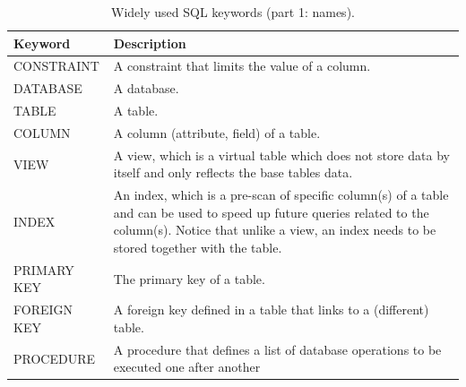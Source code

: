 \begin{table}
	\centering \caption{Widely used SQL keywords (part 1: names).}\label{ch:db:tab:sqlkeywords1}
	\begin{tabularx}{\textwidth}{lX}
		\hline
		Keyword & Description \\ \hline
		CONSTRAINT & A constraint that limits the value of a column. \\ \hdashline
		DATABASE & A database. \\ \hdashline
		TABLE & A table. \\ \hdashline
		COLUMN & A column (attribute, field) of a table. \\ \hdashline
		VIEW & A view, which is a virtual table which does not store data by itself and only reflects the base tables data. \\ \hdashline
		INDEX & An index, which is a pre-scan of specific column(s) of a table and can be used to speed up future queries related to the column(s). Notice that unlike a view, an index needs to be stored together with the table. \\ \hdashline
		PRIMARY KEY & The primary key of a table. \\ \hdashline
		FOREIGN KEY & A foreign key defined in a table that links to a (different) table. \\
		PROCEDURE & A procedure that defines a list of database operations to be executed one after another \\ \hline
	\end{tabularx}
\end{table}

